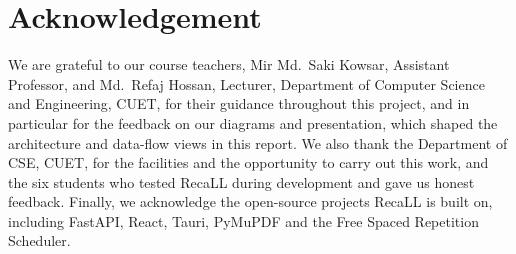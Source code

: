 \chapter*{Acknowledgement}

We are grateful to our course teachers, Mir Md.\ Saki Kowsar, Assistant Professor, and Md.\ Refaj Hossan,
Lecturer, Department of Computer Science and Engineering, CUET, for their guidance throughout this
project, and in particular for the feedback on our diagrams and presentation, which shaped the
architecture and data-flow views in this report. We also thank the Department of CSE, CUET, for the
facilities and the opportunity to carry out this work, and the six students who tested RecaLL during
development and gave us honest feedback. Finally, we acknowledge the open-source projects RecaLL is
built on, including FastAPI, React, Tauri, PyMuPDF and the Free Spaced Repetition Scheduler.
